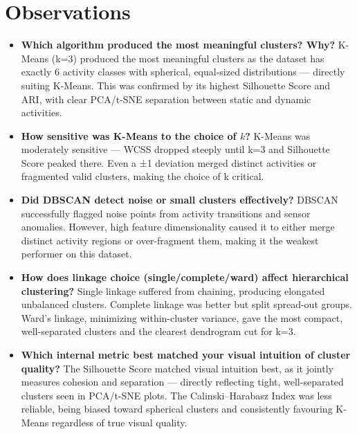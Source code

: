 \documentclass[11pt]{article}
\begin{document}
\section{Observations}

\begin{itemize}

\item \textbf{Which algorithm produced the most meaningful clusters? Why?}
K-Means (k=3) produced the most meaningful clusters as the dataset has exactly 6 activity classes with spherical, equal-sized distributions — directly suiting K-Means. This was confirmed by its highest Silhouette Score and ARI, with clear PCA/t-SNE separation between static and dynamic activities.

\item \textbf{How sensitive was K-Means to the choice of $k$?}
K-Means was moderately sensitive — WCSS dropped steeply until k=3 and Silhouette Score peaked there. Even a ±1 deviation merged distinct activities or fragmented valid clusters, making the choice of k critical.

\item \textbf{Did DBSCAN detect noise or small clusters effectively?}
DBSCAN successfully flagged noise points from activity transitions and sensor anomalies. However, high feature dimensionality caused it to either merge distinct activity regions or over-fragment them, making it the weakest performer on this dataset.

\item \textbf{How does linkage choice (single/complete/ward) affect hierarchical clustering?}
Single linkage suffered from chaining, producing elongated unbalanced clusters. Complete linkage was better but split spread-out groups. Ward's linkage, minimizing within-cluster variance, gave the most compact, well-separated clusters and the clearest dendrogram cut for k=3.

\item \textbf{Which internal metric best matched your visual intuition of cluster quality?}
The Silhouette Score matched visual intuition best, as it jointly measures cohesion and separation — directly reflecting tight, well-separated clusters seen in PCA/t-SNE plots. The Calinski–Harabasz Index was less reliable, being biased toward spherical clusters and consistently favouring K-Means regardless of true visual quality.

\end{itemize}
\end{document}

